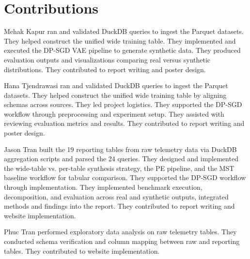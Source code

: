 \documentclass[12pt,letterpaper]{article}
\renewcommand{\_}{\textunderscore\allowbreak}
\begin{document}
\newpage

\section{Contributions}

\noindent Mehak Kapur ran and validated DuckDB queries to ingest the Parquet datasets. They helped construct the unified wide training table. They implemented and executed the DP-SGD VAE pipeline to generate synthetic data. They produced evaluation outputs and visualizations comparing real versus synthetic distributions. They contributed to report writing and poster design.

\medskip
\noindent Hana Tjendrawasi ran and validated DuckDB queries to ingest the Parquet datasets. They helped construct the unified wide training table by aligning schemas across sources. They led project logistics. They supported the DP-SGD workflow through preprocessing and experiment setup. They assisted with reviewing evaluation metrics and results. They contributed to report writing and poster design.

\medskip
\noindent Jason Tran built the 19 reporting tables from raw telemetry data via DuckDB aggregation scripts and parsed the 24 queries. They designed and implemented the wide-table vs. per-table synthesis strategy, the PE pipeline, and the MST baseline workflow for tabular comparison. They supported the DP-SGD workflow through implementation. They implemented benchmark execution, decomposition, and evaluation across real and synthetic outputs, integrated methods and findings into the report. They contributed to report writing and website implementation.

\medskip
\noindent Phuc Tran performed exploratory data analysis on raw telemetry tables. They conducted schema verification and column mapping between raw and reporting tables. They contributed to website implementation.
\end{document}
